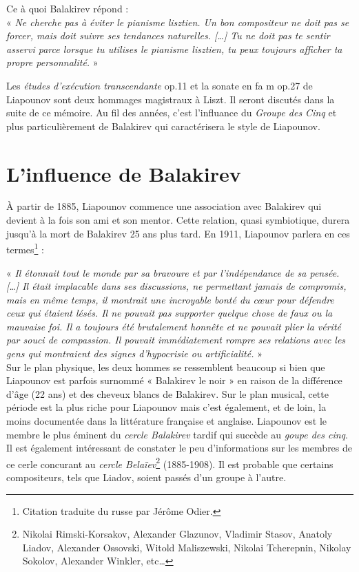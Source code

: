 \vspace*{-0.25cm}

\indent Ce à quoi Balakirev répond :\\
\indent« \emph{Ne cherche pas à éviter le pianisme lisztien. Un bon compositeur ne doit pas se forcer, mais doit suivre ses tendances naturelles. [\dots] Tu ne doit pas te sentir asservi parce lorsque tu utilises le pianisme lisztien, tu peux toujours afficher ta propre personnalité.} »

Les \emph{études d'exécution transcendante} op.11 et la sonate en fa m op.27 de Liapounov sont deux hommages magistraux à Liszt. Il seront discutés dans la suite de ce mémoire. Au fil des années, c'est l'influance du \emph{Groupe des Cinq} et plus particulièrement de Balakirev qui caractérisera le style de Liapounov.

\section{L'influence de Balakirev}

À partir de 1885, Liapounov commence une association avec Balakirev qui devient à la fois son ami et son mentor. Cette relation, quasi symbiotique, durera jusqu'à la mort de Balakirev 25 ans plus tard. En 1911, Liapounov parlera en ces termes\footnote{Citation traduite du russe par Jérôme Odier.} :

« \emph{Il étonnait tout le monde par sa bravoure et par l'indépendance de sa pensée. [\dots] Il était implacable dans ses discussions, ne permettant jamais de compromis, mais en même temps, il montrait une incroyable bonté du cœur pour défendre ceux qui étaient lésés. Il ne pouvait pas supporter quelque chose de faux ou la mauvaise foi. Il a toujours été brutalement honnête et ne pouvait plier la vérité par souci de compassion. Il pouvait immédiatement rompre ses relations avec les gens qui montraient des signes d'hypocrisie ou artificialité.} »\\

Sur le plan physique, les deux hommes se ressemblent beaucoup si bien que Liapounov est parfois surnommé « Balakirev le noir » en raison de la différence d'âge (22 ans) et des cheveux blancs de Balakirev. Sur le plan musical, cette période est la plus riche pour Liapounov mais c'est également, et de loin, la moins documentée dans la littérature française et anglaise. Liapounov est le membre le plus éminent du \emph{cercle Balakirev} tardif qui succède au \emph{goupe des cinq}. Il est également intéressant de constater le peu d'informations sur les membres de ce cerle concurant au \emph{cercle Belaïev}\footnote{Nikolai Rimski-Korsakov, Alexander Glazunov, Vladimir Stasov, Anatoly Liadov, Alexander Ossovski, Witold Maliszewski, Nikolai Tcherepnin, Nikolay Sokolov, Alexander Winkler, etc\dots} (1885-1908). Il est probable que certains compositeurs, tels que Liadov, soient passés d'un groupe à l'autre.\\

